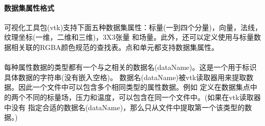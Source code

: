 \documentclass[UTF8]{ctexart}
\begin{document}
\paragraph{数据集属性格式}可视化工具包(vtk)支持下面五种数据集属性：标量(一到四个分量)，向量，法线，纹理坐标(一维，二维和三维)，3X3张量
        和场量。此外，还可以定义使用与标量数据相关联的RGBA颜色规范的查找表。点和单元都支持数据集属性。
\paragraph{\quad}每种属性数据的类型都有一个与之相关的数据名(dataName)。这是一个用于标识具体数据的字符串(没有嵌入空格)。
                数据名(dataName)被vtk读取器用来提取数据。因此一个文件中可以包含多个相同类型的属性数据。例如
                定义在数据集点中的两个不同的标量场，压力和温度，可以包含在同一个文件中。(如果在vtk读取器中没有
                指定合适的数据名(dataName)，那么只从文件中提取第一个该类型的数据。)
\end{document}
